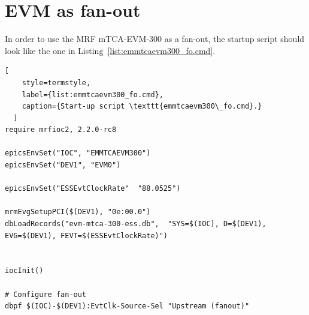 \documentclass[11pt
  , a4paper
  , article
  , oneside
  , showtrims
]{memoir}
\begin{document}
\chapter{EVM as fan-out}
In order to use the MRF mTCA-EVM-300 as a fan-out, the startup script should look like the one in Listing~\ref{list:emmtcaevm300_fo.cmd}.
\begin{lstlisting}[
    style=termstyle,
    label={list:emmtcaevm300_fo.cmd},
    caption={Start-up script \texttt{emmtcaevm300\_fo.cmd}.}
  ]
require mrfioc2, 2.2.0-rc8

epicsEnvSet("IOC", "EMMTCAEVM300")
epicsEnvSet("DEV1", "EVM0")

epicsEnvSet("ESSEvtClockRate"  "88.0525")

mrmEvgSetupPCI($(DEV1), "0e:00.0")
dbLoadRecords("evm-mtca-300-ess.db",  "SYS=$(IOC), D=$(DEV1), EVG=$(DEV1), FEVT=$(ESSEvtClockRate)")


iocInit()

# Configure fan-out
dbpf $(IOC)-$(DEV1):EvtClk-Source-Sel "Upstream (fanout)"
\end{lstlisting}


\clearpage


\end{document}
